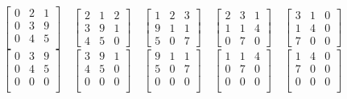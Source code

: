 \documentclass{article}
\begin{document}
		\[
		\begin{bmatrix}
			0 & 2 & 1 \\
			0 & 3 & 9 \\
			0 & 4 & 5 \\
		\end{bmatrix}
		\quad
		\begin{bmatrix}
			2 & 1 & 2 \\
			3 & 9 & 1 \\
			4 & 5 & 0
		\end{bmatrix}
		\quad
		\begin{bmatrix}
			1 & 2 & 3\\
			9 & 1 & 1\\
			5 & 0 & 7
		\end{bmatrix}
		\quad
		\begin{bmatrix}
			2 & 3 & 1\\
			1 & 1 & 4\\
			0 & 7 & 0
		\end{bmatrix}
		\quad
		\begin{bmatrix}
			3 & 1 & 0\\
			1 & 4 & 0\\
			7 & 0 & 0
		\end{bmatrix}
		\]
		\[
		\begin{bmatrix}
			0 & 3 & 9 \\
			0 & 4 & 5 \\
			0 & 0 & 0 \\
		\end{bmatrix}
		\quad
		\begin{bmatrix}
			3 & 9 & 1 \\
			4 & 5 & 0 \\
			0 & 0 & 0 \\
		\end{bmatrix}
		\quad
		\begin{bmatrix}
			9 & 1 & 1 \\
			5 & 0 & 7 \\
			0 & 0 & 0 \\
		\end{bmatrix}
		\quad
		\begin{bmatrix}
			1 & 1 & 4 \\
			0 & 7 & 0 \\
			0 & 0 & 0 \\
		\end{bmatrix}
		\quad
		\begin{bmatrix}
			1 & 4 & 0 \\
			7 & 0 & 0 \\
			0 & 0 & 0 \\
		\end{bmatrix}
		\]
		
\end{document}
